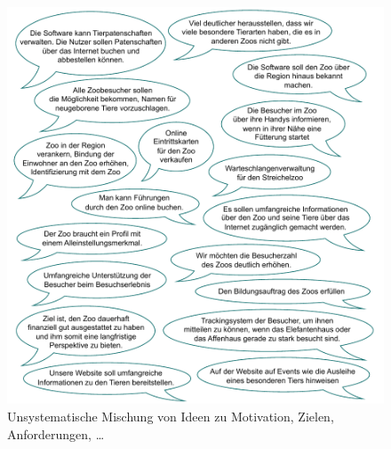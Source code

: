 \begin{figure}[h!]
	\centering
	\includegraphics[width=\textwidth]{Bilder/Kapitel-6/sprechblasen_ideen.pdf}
	\caption[Zoo-Ideen zu Motivation, Zielen, Anforderungen etc.]{Unsystematische Mischung von Ideen zu Motivation, Zielen, Anforderungen, \ldots}
	\label{fig:sprechblasen_ideen}
\end{figure}

\clearpage



